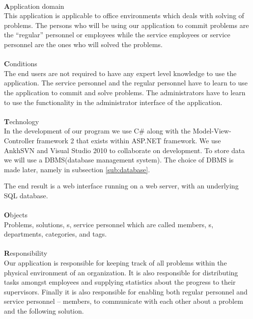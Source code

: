 \ \\
{\Large \textbf{A}}pplication domain \\
This application is applicable to office environments which deals with solving of problems.
The persons who will be using our application to commit problems are the ``regular'' personnel or employees while the service employees or service personnel are the ones who will solved the problems.\\
\ \\
{\Large \textbf{C}}onditions \\ 
The end users are not required to have any expert level knowledge to use the application.
The service personnel and the regular personnel have to learn to use the application to commit and solve problems.
The administrators have to learn to use the functionality in the administrator interface of the application. \\
\ \\
{\Large \textbf{T}}echnology \\
In the development of our program we use C\# along with the Model-View-Controller framework 2 that exists within ASP.NET framework.
We use AnkhSVN and Visual Studio 2010 to collaborate on development.
To store data we will use a DBMS(database management system).
The choice of DBMS is made later, namely in subsection \ref{sub:database}.

The end result is a web interface running on a web server, with an underlying SQL database.\\
\ \\
{\Large \textbf{O}}bjects \\
Problems, solutions, \aclient[]s, service personnel which are called \astaff[] members, \admin{}s, departments, categories, and tags. \\
\ \\
{\Large \textbf{R}}esponsibility \\
Our application is responsible for keeping track of all problems within the physical environment of an organization.
It is also responsible for distributing tasks amongst employees and supplying statistics about the progress to their supervisors.
Finally it is also responsible for enabling both regular personnel and service personnel -- \astaff[] members, to communicate with each other about a problem and the following solution.

